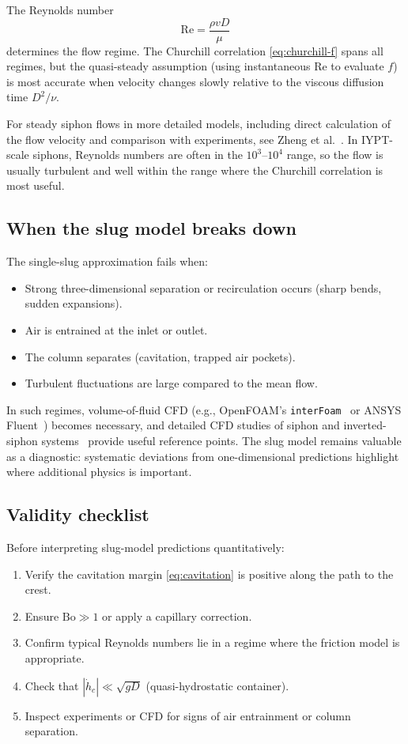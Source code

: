 \documentclass[11pt]{article}
\theoremstyle{definition}
\begin{document}
The Reynolds number
\[
  \text{Re} = \frac{\rho v D}{\mu}
\]
determines the flow regime. The Churchill correlation \eqref{eq:churchill-f} spans all 
regimes, but the quasi-steady assumption (using instantaneous $\text{Re}$ to evaluate $f$) 
is most accurate when velocity changes slowly relative to the viscous diffusion time 
$D^2/\nu$.

  For steady siphon flows in more detailed models, including direct calculation of the flow 
  velocity and comparison with experiments, see Zheng et al.~\cite{zheng_siphon}.
In IYPT-scale siphons, Reynolds numbers are often in the $10^3$--$10^4$ range, so the flow is 
usually turbulent and well within the range where the Churchill correlation is most useful.

  \subsection{When the slug model breaks down}

  The single-slug approximation fails when:
  \begin{itemize}[nosep]
  \item Strong three-dimensional separation or recirculation occurs (sharp bends, sudden 
        expansions).
  \item Air is entrained at the inlet or outlet.
    \item The column separates (cavitation, trapped air pockets).
    \item Turbulent fluctuations are large compared to the mean flow.
  \end{itemize}
  In such regimes, volume-of-fluid CFD (e.g., OpenFOAM's \texttt{interFoam}~\cite{openfoam} 
  or ANSYS Fluent~\cite{ansys_fluent}) becomes necessary, and detailed CFD studies of siphon 
  and inverted-siphon systems~\cite{ortloff_kassinos,sedlar_siphon} provide useful reference 
  points. The slug model remains valuable 
    as a diagnostic: systematic deviations from one-dimensional predictions highlight where 
    additional physics is important.

\subsection{Validity checklist}

Before interpreting slug-model predictions quantitatively:
\begin{enumerate}[nosep]
  \item Verify the cavitation margin \eqref{eq:cavitation} is positive along the path to 
        the crest.
  \item Ensure $\text{Bo} \gg 1$ or apply a capillary correction.
  \item Confirm typical Reynolds numbers lie in a regime where the friction model is 
        appropriate.
  \item Check that $|\dot{h}_c| \ll \sqrt{gD}$ (quasi-hydrostatic container).
  \item Inspect experiments or CFD for signs of air entrainment or column separation.
\end{enumerate}
\end{document}
